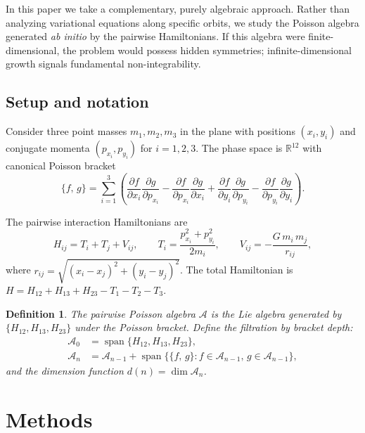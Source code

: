 \documentclass[11pt,a4paper]{article}
\newtheorem{definition}[theorem]{Definition}
\theoremstyle{remark}
\newcommand{\pb}[2]{\{#1,\,#2\}}
\newcommand{\R}{\mathbb{R}}
\newcommand{\cA}{\mathcal{A}}
\begin{document}
In this paper we take a complementary, purely algebraic approach.
Rather than analyzing variational equations along specific
orbits, we study the Poisson algebra generated \emph{ab initio}
by the pairwise Hamiltonians.  If this algebra were
finite-dimensional, the problem would possess hidden symmetries;
infinite-dimensional growth signals fundamental non-integrability.

\subsection{Setup and notation}

Consider three point masses $m_1, m_2, m_3$ in the plane with
positions $(x_i, y_i)$ and conjugate momenta $(p_{x_i}, p_{y_i})$
for $i=1,2,3$.  The phase space is $\R^{12}$ with canonical
Poisson bracket
\[
  \pb{f}{g} = \sum_{i=1}^{3}
    \left(
      \frac{\partial f}{\partial x_i}\frac{\partial g}{\partial p_{x_i}}
      - \frac{\partial f}{\partial p_{x_i}}\frac{\partial g}{\partial x_i}
      + \frac{\partial f}{\partial y_i}\frac{\partial g}{\partial p_{y_i}}
      - \frac{\partial f}{\partial p_{y_i}}\frac{\partial g}{\partial y_i}
    \right).
\]

The pairwise interaction Hamiltonians are
\[
  H_{ij} = T_i + T_j + V_{ij}, \qquad
  T_i = \frac{p_{x_i}^2 + p_{y_i}^2}{2m_i}, \qquad
  V_{ij} = -\frac{G\,m_i\,m_j}{r_{ij}},
\]
where $r_{ij} = \sqrt{(x_i-x_j)^2 + (y_i-y_j)^2}$.  The total
Hamiltonian is $H = H_{12} + H_{13} + H_{23} - T_1 - T_2 - T_3$.

\begin{definition}
The \emph{pairwise Poisson algebra} $\cA$ is the Lie algebra
generated by $\{H_{12}, H_{13}, H_{23}\}$ under the Poisson
bracket.  Define the filtration by bracket depth:
\begin{align*}
  \cA_0 &= \operatorname{span}\{H_{12}, H_{13}, H_{23}\}, \\
  \cA_n &= \cA_{n-1} + \operatorname{span}\{\pb{f}{g} : f \in \cA_{n-1},\, g \in \cA_{n-1}\},
\end{align*}
and the dimension function $d(n) = \dim \cA_n$.
\end{definition}


\section{Methods}
\end{document}
